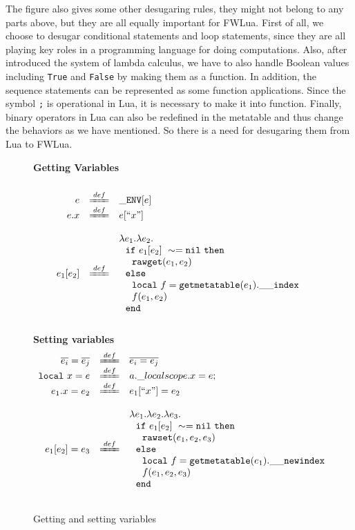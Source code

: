 \documentclass{article}
\begin{document}
The figure also gives some other desugaring rules, they might not belong to any parts above, but they are all equally important for FWLua. First of all, we choose to desugar conditional statements and loop statements, since they are all playing key roles in a programming language for doing computations. Also, after introduced the system of lambda calculus, we have to also handle Boolean values including {\tt True} and {\tt False} by making them as a function. In addition, the sequence statements can be represented as some function applications. Since the symbol {\tt ;} is operational in Lua, it is necessary to make it into function. Finally, binary operators in Lua can also be redefined in the metatable and thus change the behaviors as we have mentioned. So there is a need for desugaring them from Lua to FWLua.
\begin{figure}[P]
\caption{Getting and setting variables}
{\bf Getting Variables}
\label{fig:getandset}
\[
\begin{array}{rclcl}
\\
\desugar{e}{{\tt \_ENV}[e]}
\desugar{e.x}{e[``x"]}
\\
\desugar{
     e_1[e_2]
}{
    {\lambda}e_1.{\lambda}e_2.\\
    ~~{\tt if}~ e_1[e_2] ~\sim= {\tt nil} ~ {\tt then}\\
    ~~~~{\tt rawget}(e_1, e_2) ~\\
    ~~{\tt else}\\
    ~~~~{\tt local}~f = {\tt getmetatable}(e_1).{\tt{\_}{\_}index}~\\
    ~~~~f(e_1,e_2)\\ 
    ~~{\tt end}
}
\\
\end{array}
\]
{\bf Setting variables}
\[
\begin{array}{rclcl}
\desugar{
     \overline{e_i}=\overline{e_j}
}{   
     \overline{e_i = e_j}
}
\desugar{
     {\tt local}~x=e
}{   
  a.\_localscope.x = e;
}
\desugar{e_1.x=e_2}{e_1[``x"] = e_2}
\\
\desugar{
     e_1[e_2]=e_3
}{
    {\lambda}e_1.{\lambda}e_2.{\lambda}e_3.\\
    ~~{\tt if}~ e_1[e_2] ~\sim= {\tt nil} ~ {\tt then}\\
    ~~~~{\tt rawset}(e_1, e_2,e_3) ~\\
    ~~{\tt else}\\
    ~~~~{\tt local}~f = {\tt getmetatable}(e_1).{\tt{\_}{\_}newindex}~\\
    ~~~~f(e_1,e_2,e_3)\\ 
    ~~{\tt end}
}
\\
\end{array}
\]
\end{figure}
\end{document}
